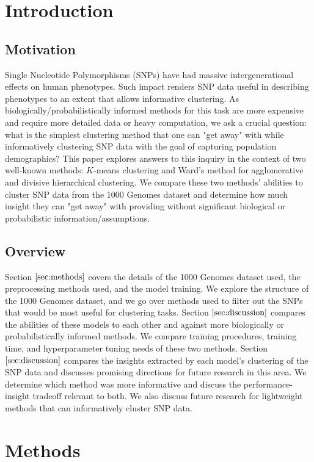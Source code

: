 \documentclass[letterpaper]{article}
\theoremstyle{definition}
\begin{document}
\section{Introduction}\label{sec:intro}
\subsection{Motivation}
\noindent Single Nucleotide Polymorphisms (SNPs) have had massive intergenerational effects on human phenotypes. Such impact renders SNP data useful in describing phenotypes to an extent that allows informative clustering. As biologically/probabilistically informed methods for this task are more expensive and require more detailed data or heavy computation, we ask a crucial question: what is the simplest clustering method that one can "get away" with while informatively clustering SNP data with the goal of capturing population demographics? This paper explores answers to this inquiry in the context of two well-known methods: $K$-means clustering and Ward's method for agglomerative and divisive hierarchical clustering. We compare these two methods' abilities to cluster SNP data from the 1000 Genomes dataset and determine how much insight they can "get away" with providing without significant biological or probabilistic information/assumptions.
\subsection{Overview}
Section $\ref{sec:methods}$ covers the details of the 1000 Genomes dataset used, the preprocessing methods used, and the model training. We explore the structure of the 1000 Genomes dataset, and we go over methods used to filter out the SNPs that would be most useful for clustering tasks. Section $\ref{sec:discussion}$ compares the abilities of these models to each other and against more biologically or probabilistically informed methods. We compare training procedures, training time, and hyperparameter tuning needs of these two methods. Section $\ref{sec:discussion}$ compares the insights extracted by each model's clustering of the SNP data and discusses promising directions for future research in this area. We determine which method was more informative and discuss the performance-insight tradeoff relevant to both. We also discuss future research for lightweight methods that can informatively cluster SNP data.
\section{Methods}\label{sec:methods}
\end{document}
